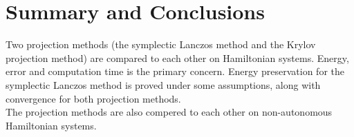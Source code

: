 \section*{Summary and Conclusions}
Two projection methods (the symplectic Lanczos method and the Krylov projection method) are compared to each other on Hamiltonian systems. Energy, error and computation time is the primary concern. Energy preservation for the symplectic Lanczos method is proved under some assumptions, along with convergence for both projection methods. \\
The projection methods are also compered to each other on non-autonomous Hamiltonian systems.



